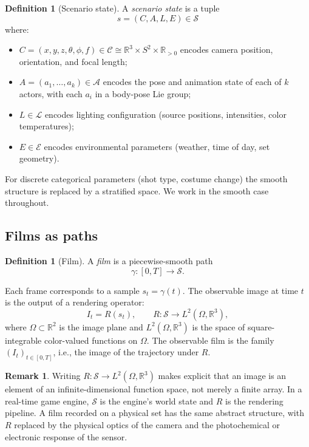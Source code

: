 \documentclass[12pt,a4paper]{article}
\theoremstyle{plain}
\theoremstyle{definition}
\newtheorem{definition}[theorem]{Definition}
\newtheorem{remark}[theorem]{Remark}
\begin{document}
\begin{definition}[Scenario state]
A \emph{scenario state} is a tuple
\[
s = (C, A, L, E) \in \mathcal{S}
\]
where:
\begin{itemize}[nosep]
\item $C = (x,y,z,\theta,\phi,f) \in \mathcal{C} \cong \mathbb{R}^3
  \times S^2 \times \mathbb{R}_{>0}$ encodes camera position, orientation,
  and focal length;
\item $A = (a_1,\dots,a_k) \in \mathcal{A}$ encodes the pose and animation
  state of each of $k$ actors, with each $a_i$ in a body-pose Lie group;
\item $L \in \mathcal{L}$ encodes lighting configuration (source positions,
  intensities, color temperatures);
\item $E \in \mathcal{E}$ encodes environmental parameters (weather, time of
  day, set geometry).
\end{itemize}
\end{definition}

For discrete categorical parameters (shot type, costume change) the smooth
structure is replaced by a stratified space. We work in the smooth case
throughout.

\subsection{Films as paths}

\begin{definition}[Film]
A \emph{film} is a piecewise-smooth path
\[
\gamma: [0,T] \to \mathcal{S}.
\]
\end{definition}

Each frame corresponds to a sample $s_t = \gamma(t)$. The observable image at
time $t$ is the output of a rendering operator:
\[
I_t = R(s_t),
\qquad R:\mathcal{S}\to L^2(\Omega,\mathbb{R}^3),
\]
where $\Omega\subset\mathbb{R}^2$ is the image plane and $L^2(\Omega,\mathbb{R}^3)$
is the space of square-integrable color-valued functions on $\Omega$. The
observable film is the family $(I_t)_{t\in[0,T]}$, i.e., the image of the
trajectory under $R$.

\begin{remark}
Writing $R:\mathcal{S}\to L^2(\Omega,\mathbb{R}^3)$ makes explicit that an
image is an element of an infinite-dimensional function space, not merely a
finite array. In a real-time game engine, $\mathcal{S}$ is the engine's world
state and $R$ is the rendering pipeline. A film recorded on a physical set has
the same abstract structure, with $R$ replaced by the physical optics of the
camera and the photochemical or electronic response of the sensor.
\end{remark}
\end{document}
